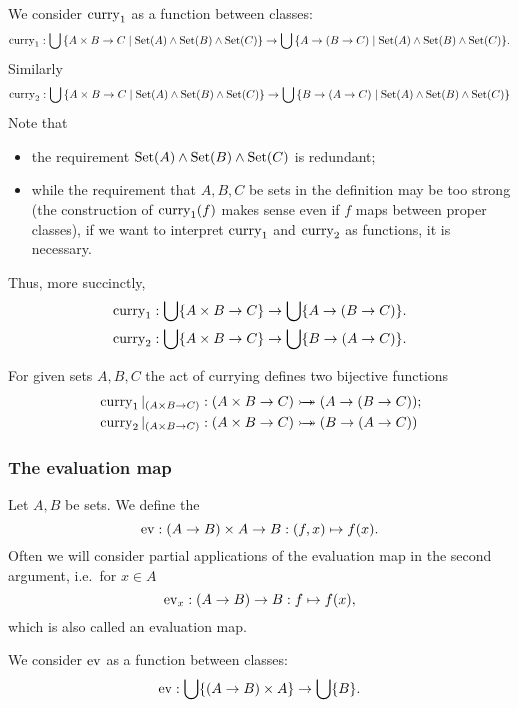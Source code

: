 We consider $\operatorname{curry}_1$ as a function between classes:
\[ \curry_1: \bigcup\setbuilder{A\times B \to C}{\Set(A)\land \Set(B)\land \Set(C)} \to \bigcup\setbuilder{A \to (B\to C)}{\Set(A)\land \Set(B)\land \Set(C)}. \]
Similarly
\[ \curry_2: \bigcup\setbuilder{A\times B \to C}{\Set(A)\land \Set(B)\land \Set(C)} \to \bigcup\setbuilder{B \to (A\to C)}{\Set(A)\land \Set(B)\land \Set(C)} \]
Note that
\begin{itemize}
\item the requirement $\operatorname{Set}(A)\land \operatorname{Set}(B)\land \operatorname{Set}(C)$ is redundant;
\item while the requirement that $A,B,C$ be sets in the definition may be too strong (the construction of $\operatorname{curry}_1(f)$ makes sense even if $f$ maps between proper classes), if we want to interpret $\operatorname{curry}_1$ and $\operatorname{curry}_2$ as functions, it is necessary.
\end{itemize}
Thus, more succinctly,
\begin{align*}
\operatorname{curry}_1&: \bigcup\{A\times B \to C\} \to \bigcup\{A \to (B\to C)\}. \\
\operatorname{curry}_2&: \bigcup\{A\times B \to C\} \to \bigcup\{B \to (A\to C)\}.
\end{align*}

\begin{lemma}
For given sets $A,B,C$ the act of currying defines two bijective functions
\begin{align*}
&\operatorname{curry}_1|_{(A\times B \to C)}: (A\times B \to C) \mathrel{\rightarrowtail\kern-1.9ex\twoheadrightarrow} (A \to (B\to C)); \\
&\operatorname{curry}_2|_{(A\times B \to C)}: (A\times B \to C) \mathrel{\rightarrowtail\kern-1.9ex\twoheadrightarrow} (B \to (A\to C))
\end{align*}
\end{lemma}

\subsubsection{The evaluation map}
\begin{definition}
Let $A,B$ be sets. We define the 
\[ \operatorname{ev}: (A\to B)\times A \to B: (f,x) \mapsto f(x). \]
Often we will consider partial applications of the evaluation map in the second argument, i.e.\ for $x\in A$
\[ \operatorname{ev}_x: (A\to B) \to B: f\mapsto f(x), \]
which is also called an evaluation map.
\end{definition}

We consider $\operatorname{ev}$ as a function between classes:
\[ \operatorname{ev}: \bigcup\{(A\to B)\times A\} \to \bigcup\{B\}. \]

